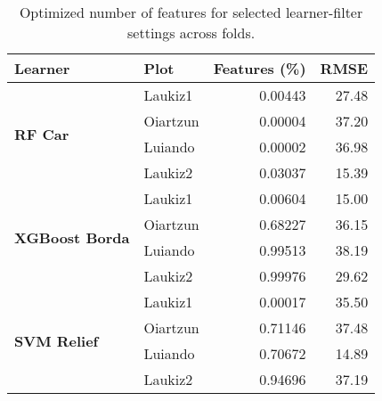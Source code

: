 \begin{table}[ht!]
\centering
\caption{Optimized number of features for selected learner-filter settings across folds.} 
\label{tab:tune-perc-sel-features}
\begin{tabular}{llrr}
  \toprule
Learner & Plot & Features (\%) & RMSE \\ 
  \midrule
\midrule\multirow{4}{*}{\textbf{RF Car}} & Laukiz1 & 0.00443 & 27.48 \\ 
   & Oiartzun & 0.00004 & 37.20 \\ 
   & Luiando & 0.00002 & 36.98 \\ 
   & Laukiz2 & 0.03037 & 15.39 \\ 
  \midrule\multirow{4}{*}{\textbf{XGBoost Borda}} & Laukiz1 & 0.00604 & 15.00 \\ 
   & Oiartzun & 0.68227 & 36.15 \\ 
   & Luiando & 0.99513 & 38.19 \\ 
   & Laukiz2 & 0.99976 & 29.62 \\ 
  \midrule\multirow{4}{*}{\textbf{SVM Relief}} & Laukiz1 & 0.00017 & 35.50 \\ 
   & Oiartzun & 0.71146 & 37.48 \\ 
   & Luiando & 0.70672 & 14.89 \\ 
   & Laukiz2 & 0.94696 & 37.19 \\ 
   \bottomrule
\end{tabular}
\end{table}
